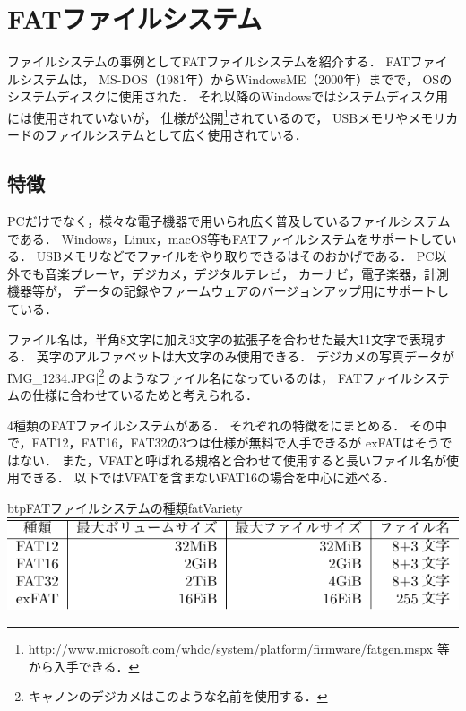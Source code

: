 \chapter{FATファイルシステム}
ファイルシステムの事例としてFATファイルシステムを紹介する．
FATファイルシステムは，
MS-DOS（1981年）からWindowsME（2000年）までで，
OSのシステムディスクに使用された．
それ以降のWindowsではシステムディスク用には使用されていないが，
仕様が公開\footnote{
  \url{http://www.microsoft.com/whdc/system/platform/firmware/fatgen.mspx
}等から入手できる．}されているので，
USBメモリやメモリカードのファイルシステムとして広く使用されている．

\section{特徴}
PCだけでなく，様々な電子機器で用いられ広く普及しているファイルシステムである．
Windows，Linux，macOS等もFATファイルシステムをサポートしている．
USBメモリなどでファイルをやり取りできるはそのおかげである．
PC以外でも音楽プレーヤ，デジカメ，デジタルテレビ，
カーナビ，電子楽器，計測機器等が，
データの記録やファームウェアのバージョンアップ用にサポートしている．

ファイル名は，半角8文字に加え3文字の拡張子を合わせた最大11文字で表現する．
英字のアルファベットは大文字のみ使用できる．
デジカメの写真データが\|IMG_1234.JPG|\footnote{
キャノンのデジカメはこのような名前を使用する．}
のようなファイル名になっているのは，
FATファイルシステムの仕様に合わせているためと考えられる．

4種類のFATファイルシステムがある．
それぞれの特徴をにまとめる．
その中で，FAT12，FAT16，FAT32の3つは仕様が無料で入手できるが
exFATはそうではない．
また，VFATと呼ばれる規格と合わせて使用すると長いファイル名が使用できる．
以下ではVFATを含まないFAT16の場合を中心に述べる．

\begin{mytable}{btp}{FATファイルシステムの種類}{fatVariety}
  \includegraphics[scale=1.0]{Tbl/fatVariety.pdf}
\end{mytable}

